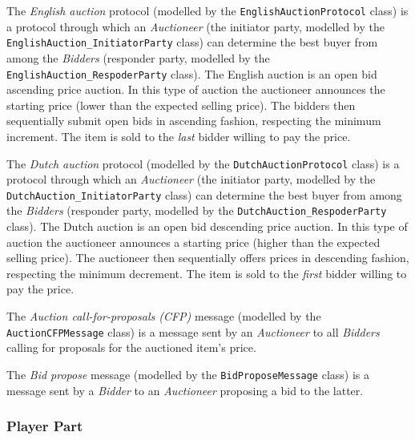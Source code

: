 The \textit{English auction} protocol (modelled by the \texttt{EnglishAuctionProtocol} class) is a protocol through which an \textit{Auctioneer} (the initiator party, modelled by the \texttt{EnglishAuction\_InitiatorParty} class) can determine the best buyer from among the \textit{Bidders} (responder party, modelled by the \texttt{EnglishAuction\_RespoderParty} class).
The English auction is an open bid ascending price auction.
In this type of auction the auctioneer announces the starting price (lower than the expected selling price).
The bidders then sequentially submit open bids in ascending fashion, respecting the minimum increment.
The item is sold to the \textit{last} bidder willing to pay the price.

The \textit{Dutch auction} protocol (modelled by the \texttt{DutchAuctionProtocol} class) is a protocol through which an \textit{Auctioneer} (the initiator party, modelled by the \texttt{DutchAuction\_InitiatorParty} class) can determine the best buyer from among the \textit{Bidders} (responder party, modelled by the \texttt{DutchAuction\_RespoderParty} class).
The Dutch auction is an open bid descending price auction.
In this type of auction the auctioneer announces a starting price (higher than the expected selling price).
The auctioneer then sequentially offers prices in descending fashion, respecting the minimum decrement.
The item is sold to the \textit{first} bidder willing to pay the price.

The \textit{Auction call-for-proposals (CFP)} message (modelled by the \texttt{AuctionCFPMessage} class) is a message sent by an \textit{Auctioneer} to all \textit{Bidders} calling for proposals for the auctioned item's price.

The \textit{Bid propose} message (modelled by the \texttt{BidProposeMessage} class) is a message sent by a \textit{Bidder} to an \textit{Auctioneer} proposing a bid to the latter.

\subsubsection*{Player Part}

